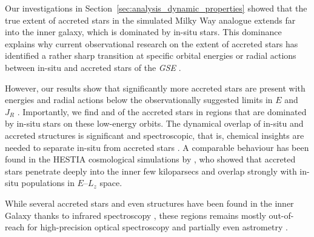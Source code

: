 \documentclass[fleqn,usenatbib]{mnras}
\newcommand{\changed}[1]{{{#1}}}
\begin{document}
Our investigations in Section~\ref{sec:analysis_dynamic_properties} showed that the true extent of accreted stars in the simulated Milky Way analogue extends far into the inner galaxy, which is dominated by in-situ stars. This dominance explains why current observational research on the extent of accreted stars has identified a rather sharp transition at specific orbit\changed{al} energies or radial actions between in-situ and accreted stars of the \textit{GSE} \citep{Helmi2018, Feuillet2021, Monty2024}.

However, our results show that significantly more accreted stars are present with energies and radial actions below the observationally suggested limits in $E$ \citep{Helmi2018, Monty2024} and $J_R$ \citep{Feuillet2020, Feuillet2021}. Importantly, we find  and  of the accreted stars in regions that are dominated by in-situ stars on these low-energy orbits. The dynamical overlap of in-situ and accreted structures is significant and spectroscopic, that is, chemical insights are needed to separate in-situ from accreted stars \citep[for example][]{Das2020, Horta2021, Sestito2021, Buder2022}. \changed{A comparable behaviour has been found in the HESTIA cosmological simulations by \citet{Khoperskov2023b}, who showed that accreted stars penetrate deeply into the inner few kiloparsecs and overlap strongly with in-situ populations in $E$–$L_z$ space.}

While several accreted stars and even structures have been found in the inner Galaxy thanks to infrared spectroscopy \citep[for example][]{Horta2021}, \changed{these} regions remains mostly out-of-reach for high-precision optical spectroscopy and partially even astrometry \citep{Queiroz2023}.
\end{document}
